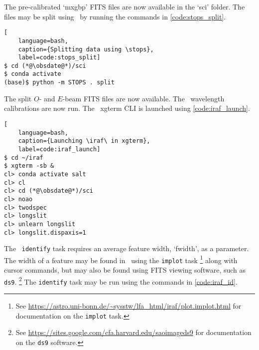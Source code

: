 The pre-calibrated `mxgbp' \gls{FITS} files are now available in the `sci' folder. The files may be split using \stops\ by running the commands in \autoref{code:stops_split}.

\begin{lstlisting}[
    language=bash,
    caption={Splitting data using \stops},
    label=code:stops_split]
$ cd (*@\obsdate@*)/sci
$ conda activate
(base)$ python -m STOPS . split
\end{lstlisting}

The split $O$- and $E$-beam \gls{FITS} files are now available. The \iraf\ wavelength calibrations are now run. The \iraf\ xgterm \gls{CLI} is launched using \autoref{code:iraf_launch}.

\begin{lstlisting}[
    language=bash,
    caption={Launching \iraf\ in xgterm},
    label=code:iraf_launch]
$ cd ~/iraf
$ xgterm -sb &
cl> conda activate salt
cl> cl
cl> cd (*@\obsdate@*)/sci
cl> noao
cl> twodspec
cl> longslit
cl> unlearn longslit
cl> longslit.dispaxis=1
\end{lstlisting}

\pagebreak

The \iraf\ \texttt{identify} task requires an average feature width, `fwidth', as a parameter. The width of a feature may be found in \iraf\ using the \texttt{implot} task%
\footnote{See \protect\url{https://astro.uni-bonn.de/~sysstw/lfa_html/iraf/plot.implot.html} for documentation on the \texttt{implot} task.}
along with cursor commands, but may also be found using \gls{FITS} viewing software, such as \texttt{ds9}.%
\footnote{See \protect\url{https://sites.google.com/cfa.harvard.edu/saoimageds9} for documentation on the \texttt{ds9} software.}
The \texttt{identify} task may be run using the commands in \autoref{code:iraf_id}.

